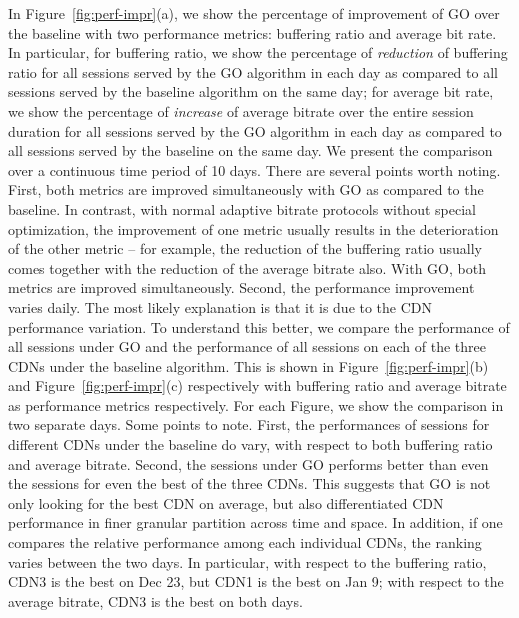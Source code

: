 In Figure~\ref{fig:perf-impr}(a), we show the percentage of improvement of GO over the baseline with two performance metrics: buffering ratio and average bit rate.  In particular, for buffering ratio, we show the percentage of {\em reduction} of buffering ratio for all sessions served by the GO algorithm in each day as compared to all sessions served by the baseline algorithm on the same day; for average bit rate, we show the percentage of {\em increase} of average bitrate over the entire session duration for all sessions served by the GO algorithm in each day as compared to all sessions served by the baseline on the same day.  We present the comparison over a continuous time period of 10 days. There are several points worth noting. First, both metrics are improved simultaneously with GO as compared to the baseline. In contrast, with normal adaptive bitrate protocols without special optimization, the improvement of one metric usually results in the deterioration of the other metric -- for example, the reduction of the buffering ratio usually comes together with the reduction of the average bitrate also.   With GO, both metrics are 
improved simultaneously.  Second, the performance improvement varies daily.  The most likely explanation is that it is due to the CDN performance variation.  To understand this better, we compare the performance of all sessions under GO and the performance of all sessions on each of the three CDNs under the baseline algorithm. This is shown in Figure~\ref{fig:perf-impr}(b) and Figure~\ref{fig:perf-impr}(c) respectively with buffering ratio and average bitrate as performance metrics respectively.  For each Figure, we show the comparison in two separate days.  Some points to note. First, the performances of sessions for different CDNs under the baseline do vary, with respect to both buffering ratio and average bitrate. Second, the sessions under GO performs better than even the sessions for even the best of the three CDNs. This suggests that GO is not only looking for the best CDN on average, but also 
differentiated CDN performance in finer granular partition across time and space.  In addition, if one compares the relative performance among each individual CDNs, the ranking varies between the two days. In particular, with respect to the buffering ratio, CDN3 is the best on Dec 23, but CDN1 is the best on Jan 9; with respect to the average bitrate, CDN3 is the best on both days.  
 
